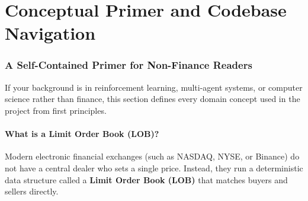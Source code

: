 \documentclass[11pt,a4paper]{article}
\begin{document}
\tableofcontents
\clearpage

\part{Conceptual Primer and Codebase Navigation}
\label{part:primer}

\section{A Self-Contained Primer for Non-Finance Readers}
\label{sec:primer}

If your background is in reinforcement learning, multi-agent systems, or computer science rather than
finance, this section defines every domain concept used in the project from first principles.

\subsection{What is a Limit Order Book (LOB)?}

Modern electronic financial exchanges (such as NASDAQ, NYSE, or Binance) do not have a central dealer
who sets a single price. Instead, they run a deterministic data structure called a \textbf{Limit Order
Book (LOB)} that matches buyers and sellers directly.
\end{document}
